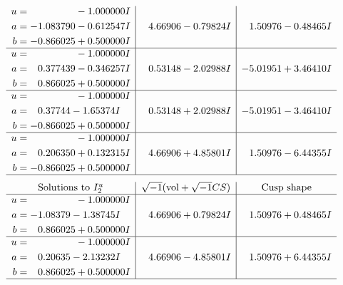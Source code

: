 \documentclass[1p]{elsarticle_modified}
\theoremstyle{definition}
\newcommand{\I}{\sqrt{-1}}
\begin{document}
$$\begin{array}{c|c|c}
\begin{aligned}
u &= \phantom{-0.000000 } -1.000000 I \\
a &= -1.083790 - 0.612547 I \\
b &= -0.866025 + 0.500000 I\end{aligned}
 & \phantom{-}4.66906 - 0.79824 I & \phantom{-}1.50976 - 0.48465 I \\ \hline\begin{aligned}
u &= \phantom{-0.000000 } -1.000000 I \\
a &= \phantom{-}0.377439 - 0.346257 I \\
b &= \phantom{-}0.866025 + 0.500000 I\end{aligned}
 & \phantom{-}0.53148 - 2.02988 I & -5.01951 + 3.46410 I \\ \hline\begin{aligned}
u &= \phantom{-0.000000 } -1.000000 I \\
a &= \phantom{-}0.37744 - 1.65374 I \\
b &= -0.866025 + 0.500000 I\end{aligned}
 & \phantom{-}0.53148 + 2.02988 I & -5.01951 - 3.46410 I \\ \hline\begin{aligned}
u &= \phantom{-0.000000 } -1.000000 I \\
a &= \phantom{-}0.206350 + 0.132315 I \\
b &= -0.866025 + 0.500000 I\end{aligned}
 & \phantom{-}4.66906 + 4.85801 I & \phantom{-}1.50976 - 6.44355 I\\
 \hline 
 \end{array}$$\newpage$$\begin{array}{c|c|c}  
\text{Solutions to }I^u_{2}& \I (\text{vol} + \sqrt{-1}CS) & \text{Cusp shape}\\
 \hline 
\begin{aligned}
u &= \phantom{-0.000000 } -1.000000 I \\
a &= -1.08379 - 1.38745 I \\
b &= \phantom{-}0.866025 + 0.500000 I\end{aligned}
 & \phantom{-}4.66906 + 0.79824 I & \phantom{-}1.50976 + 0.48465 I \\ \hline\begin{aligned}
u &= \phantom{-0.000000 } -1.000000 I \\
a &= \phantom{-}0.20635 - 2.13232 I \\
b &= \phantom{-}0.866025 + 0.500000 I\end{aligned}
 & \phantom{-}4.66906 - 4.85801 I & \phantom{-}1.50976 + 6.44355 I\\
 \hline 
 \end{array}$$\newpage
\end{document}

